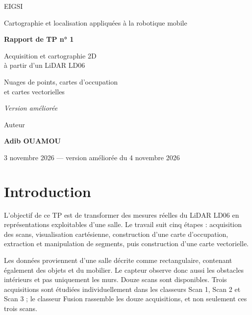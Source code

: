 \documentclass[11pt,a4paper]{article}
\begin{document}
\begin{titlepage}
\centering
\vspace*{1.8cm}
{\Large EIGSI\par}
\vspace{0.5cm}
{\large Cartographie et localisation appliquées à la robotique mobile\par}
\vspace{2.0cm}
{\Huge\bfseries Rapport de TP n° 1\par}
\vspace{0.7cm}
{\LARGE Acquisition et cartographie 2D\\à partir d'un LiDAR LD06\par}
\vspace{0.9cm}
{\large Nuages de points, cartes d'occupation\\et cartes vectorielles\par}
\vspace{0.6cm}
{\large\itshape Version améliorée\par}
\vfill
{\large Auteur\par}
\vspace{0.2cm}
{\LARGE\bfseries Adib OUAMOU\par}
\vspace{1.0cm}
{\large 3 novembre 2026 --- version améliorée du 4 novembre 2026\par}
\vspace{1cm}
\end{titlepage}

\tableofcontents
\newpage
{}
\section*{Introduction}
L'objectif de ce TP est de transformer des mesures réelles du LiDAR LD06
en représentations exploitables d'une salle. Le travail suit cinq étapes :
acquisition des scans, visualisation cartésienne, construction d'une carte
d'occupation, extraction et manipulation de segments, puis construction
d'une carte vectorielle.

Les données proviennent d'une salle décrite comme rectangulaire, contenant
également des objets et du mobilier. Le capteur observe donc aussi les
obstacles intérieurs et pas uniquement les murs. Douze scans sont disponibles.
Trois acquisitions sont étudiées individuellement dans les classeurs
Scan 1, Scan 2 et Scan 3 ; le classeur Fusion rassemble les douze acquisitions,
et non seulement ces trois scans.
\end{document}
